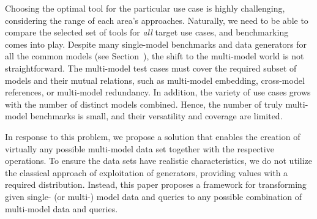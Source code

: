 
Choosing the optimal tool for the particular use case is highly challenging, considering the range of each area's approaches. Naturally, we need to be able to compare the selected set of tools for \textit{all} target use cases, and benchmarking comes into play. Despite many single-model benchmarks and data generators for all the common models (see Section~), the shift to the multi-model world is not straightforward. The multi-model test cases must cover the required subset of models and their mutual relations, such as multi-model embedding, cross-model references, or multi-model redundancy. In addition, the variety of use cases grows with the number of distinct models combined. Hence, the number of truly multi-model benchmarks is small, and their versatility and coverage are limited.

In response to this problem, we propose a solution that enables the creation of virtually any possible multi-model data set together with the respective operations. To ensure the data sets have realistic characteristics, we do not utilize the classical approach of exploitation of generators, providing values with a required distribution. Instead, this paper proposes a framework for transforming given single- (or multi-) model data and queries to any possible combination of multi-model data and queries.

